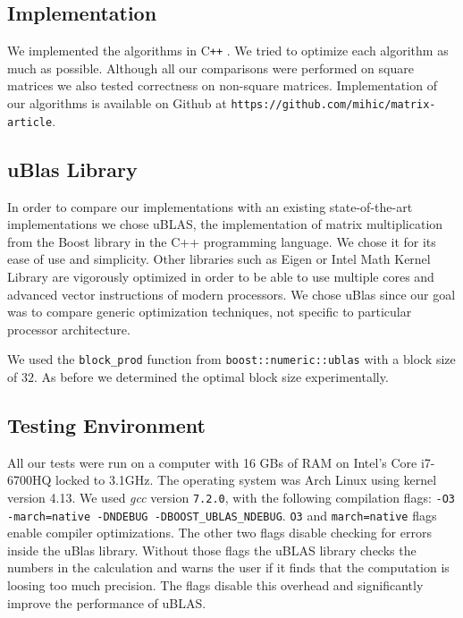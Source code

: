 \documentclass[a4paper,11pt]{article}
\newcommand{\cpp}{C\texttt{++} }
\begin{document}
\subsection{Implementation}
We implemented the algorithms in \cpp. We tried to optimize each algorithm as much as possible. Although all our comparisons were performed on square matrices we also tested correctness on non-square matrices. Implementation of our algorithms is available on Github at \texttt{https://github.com/mihic/matrix-article}.


\subsection{uBlas Library}
In order to compare our implementations with an existing state-of-the-art implementations we chose uBLAS, the implementation of matrix multiplication from the Boost library in the C++ programming language. We chose it for its ease of use and simplicity. Other libraries such as Eigen \cite{eigen} or Intel Math Kernel Library \cite{mkl} are vigorously optimized in order to be able to use multiple cores and advanced vector instructions of modern processors. We chose uBlas since our goal was to compare generic optimization techniques, not specific to particular processor architecture.

We used the \texttt{block\_prod} function from \texttt{boost::numeric::ublas} with a block size of $32$. As before we determined the optimal block size experimentally.


\subsection{Testing Environment}
All our tests were run on a computer with 16 GBs of RAM on Intel's Core i7-6700HQ locked to 3.1GHz. The operating system was Arch Linux using kernel version 4.13. We used \textit{gcc} version \texttt{7.2.0}, with the following compilation flags: \texttt{-O3 -march=native -DNDEBUG -DBOOST\_UBLAS\_NDEBUG}. \texttt{O3} and \texttt{march=native} flags enable compiler optimizations. The other two flags disable checking for errors inside the uBlas library. Without those flags the uBLAS library checks the numbers in the calculation and warns the user if it finds that the computation is loosing too much precision. The flags disable this overhead and significantly improve the performance of uBLAS. 
\end{document}
